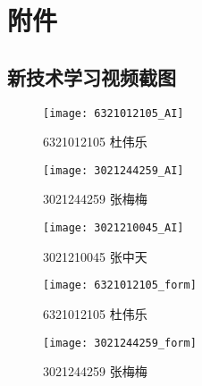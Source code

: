 \chapter{附件}
\section{新技术学习视频截图}
\begin{figure}[htbp]
    \centering
    \texttt{[image: 6321012105\_AI]}
    \caption{6321012105 杜伟乐}\label{fig:6321012105_AI}
    \vspace{\baselineskip}
\end{figure}
\begin{figure}[htbp]
    \centering
    \texttt{[image: 3021244259\_AI]}
    \caption{3021244259 张梅梅}\label{fig:3021244259_AI}
    \vspace{\baselineskip}
\end{figure}
\begin{figure}[htbp]
    \centering
    \texttt{[image: 3021210045\_AI]}
    \caption{3021210045 张中天}\label{fig:3021210045_AI}
    \vspace{\baselineskip}
\end{figure}
\begin{figure}[htbp]
    \centering
    \begin{minipage}{0.4\textwidth}
        \centering
        \texttt{[image: 6321012105\_form]}
        \caption{6321012105 杜伟乐}\label{fig:6321012105_form}
    \end{minipage}
    \begin{minipage}{0.4\textwidth}
        \centering
        \texttt{[image: 3021244259\_form]}
        \caption{3021244259 张梅梅}\label{fig:3021244259_form}
    \end{minipage}
\end{figure}
